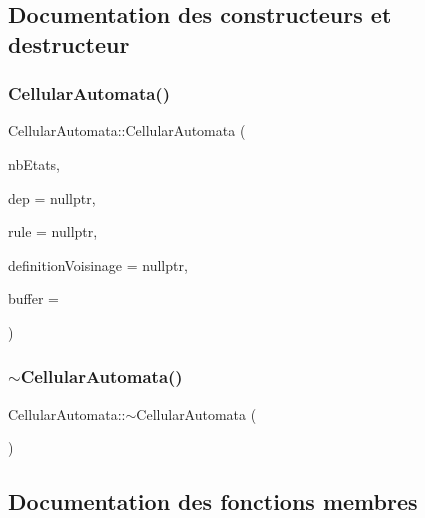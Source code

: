 \subsection{Documentation des constructeurs et destructeur}
\mbox{\label{class_cellular_automata_af50a5ecce37ce634058c6cd8724f6732}} 
\subsubsection{\texorpdfstring{Cellular\+Automata()}{CellularAutomata()}}
{\footnotesize\ttfamily Cellular\+Automata\+::\+Cellular\+Automata (\begin{DoxyParamCaption}\item[{unsigned int}]{nb\+Etats,  }\item[{const \mbox{\hyperlink{class_etat}{Etat}} $\ast$}]{dep = {\ttfamily nullptr},  }\item[{const \mbox{\hyperlink{class_transition_rule}{Transition\+Rule}} $\ast$}]{rule = {\ttfamily nullptr},  }\item[{const \mbox{\hyperlink{class_voisinage}{Voisinage}} $\ast$}]{definition\+Voisinage = {\ttfamily nullptr},  }\item[{unsigned int}]{buffer = {} }\end{DoxyParamCaption})}

\mbox{\label{class_cellular_automata_a50e6daa1b843aeb3bcafc634ae219ed8}} 
\subsubsection{\texorpdfstring{$\sim$\+Cellular\+Automata()}{~CellularAutomata()}}
{\footnotesize\ttfamily Cellular\+Automata\+::$\sim$\+Cellular\+Automata (\begin{DoxyParamCaption}{ }\end{DoxyParamCaption})}



\subsection{Documentation des fonctions membres}
\mbox{\label{class_cellular_automata_ad0c57645f11882d3290e6493f4773c3c}} 
